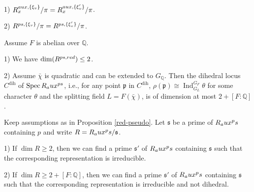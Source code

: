 \documentclass[10pt,a4paper]{amsart}
\begin{document}
\begin{prop}\label{RX1}
	1) $R_x^{\textnormal{aux}, \{\xi_v\}}/\pi=R_x^{\textnormal{aux}, \{\xi'_v\}}/\pi$.
	
	2) $R^{\textnormal{ps}, \{\xi_v\}}/\pi= R^{\textnormal{ps}, \{\xi'_v\}}/\pi$. 
\end{prop}

\begin{prop}\label{red-pseudo} Assume $F$ is abelian over $\mathbb{Q}$.
	
	1) We have $\operatorname{dim}(R^{\textnormal{ps,red}}) \le 2$.
	
	2) Assume $\bar{\chi}$ is quadratic and can be extended to $G_{\mathbb{Q}}$. Then the dihedral locus $C^{\operatorname{dih}}$ of $\operatorname{Spec} R_\textnormal{aux}^{\textnormal{ps}}$, i.e., for any point $\mathfrak{p}$ in $C^{\operatorname{dih}}$, $\rho(\mathfrak{p}) \cong \operatorname{Ind}_{G_L}^{G_F} \theta$ for some character $\theta$ and the splitting field $L=F(\bar{\chi})$, is of dimension at most $2+[F: \mathbb{Q}]$. 
\end{prop}

\begin{cor}\label{red-one}
	Keep assumptions as in Proposition \ref{red-pseudo}. Let $\mathfrak{s}$ be a prime of $R_\textnormal{aux}^\textnormal{ps} $ containing $p$ and write $R=R_\textnormal{aux}^\textnormal{ps}/\mathfrak{s}$.
	
	1) If $\dim R \ge 2$, then we can find a prime $\mathfrak{s}'$ of $R_\textnormal{aux}^\textnormal{ps} $ containing $\mathfrak{s}$ such that the corresponding representation is irreducible.
	
	2) If $\dim R \ge 2+[F: \mathbb{Q}]$, then we can find a prime $\mathfrak{s}'$ of $R_\textnormal{aux}^\textnormal{ps} $ containing $\mathfrak{s}$ such that the corresponding representation is irreducible and not dihedral.
\end{cor}
\end{document}
